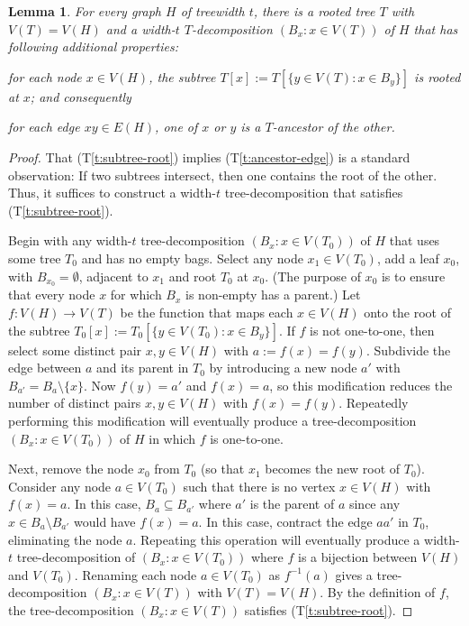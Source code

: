 \documentclass{patmorin}
\theoremstyle{plain}
\newtheorem{lem}[thm]{Lemma}
\theoremstyle{definition}
\newcommand{\tlabel}[1]{\label{t:#1}}
\newcommand{\tref}[1]{(T\ref{t:#1})}
\renewcommand{\le}{\leqslant}
\begin{document}
\begin{lem}\label{nice-decomposition}
  For every graph $H$ of treewidth $t$, there is a rooted tree $T$ with $V(T)=V(H)$ and a width-$t$ $T$-decomposition $(B_x:x\in V(T))$ of $H$ that has following additional properties:
  \begin{compactenum}[(T1)]
    \item\tlabel{subtree-root} for each node $x\in V(H)$, the subtree $T[x]:=T[\{y\in V(T):x\in B_y\}]$ is rooted at $x$; and consequently
    \item\tlabel{ancestor-edge}\tlabel{last} for each edge $xy\in E(H)$, one of $x$ or $y$ is a $T$-ancestor of the other.
  \end{compactenum}
\end{lem}

\begin{proof}
  That \tref{subtree-root} implies \tref{ancestor-edge} is a standard observation: If two subtrees intersect, then one contains the root of the other.  Thus, it suffices to construct a width-$t$ tree-decomposition that satisfies \tref{subtree-root}.

  Begin with any width-$t$ tree-decomposition $(B_x:x\in V(T_0))$ of $H$ that uses some tree $T_0$ and has no empty bags.  Select any node $x_1\in V(T_0)$, add a leaf $x_0$, with $B_{x_0}=\emptyset$, adjacent to $x_1$ and root $T_0$ at $x_0$. (The purpose of $x_0$ is to ensure that every node $x$ for which $B_x$ is non-empty has a parent.)  Let $f:V(H)\to V(T)$ be the function that maps each $x\in V(H)$ onto the root of the subtree $T_0[x]:=T_0[\{y\in V(T_0): x\in B_y\}]$.  If $f$ is not one-to-one, then select some distinct pair $x,y\in V(H)$ with $a:=f(x)=f(y)$.  Subdivide the edge between $a$ and its parent in $T_0$ by introducing a new node $a'$ with $B_{a'}=B_{a}\setminus\{x\}$. Now $f(y)=a'$ and $f(x)=a$, so this modification reduces the number of distinct pairs $x,y\in V(H)$ with $f(x)=f(y)$.  Repeatedly performing this modification will eventually produce a tree-decomposition $(B_x:x\in V(T_0))$ of $H$ in which $f$ is one-to-one.

  Next, remove the node $x_0$ from $T_0$ (so that $x_1$ becomes the new root of $T_0$).  Consider any node $a\in V(T_0)$ such that there is no vertex $x\in V(H)$ with $f(x)=a$.  In this case, $B_{a}\subseteq B_{a'}$ where $a'$ is the parent of $a$ since any $x\in B_a\setminus B_{a'}$ would have $f(x)=a$.  In this case, contract the edge $aa'$ in $T_0$, eliminating the node $a$.  Repeating this operation will eventually produce a width-$t$ tree-decomposition of $(B_x:x\in V(T_0))$ where $f$ is a bijection between $V(H)$ and $V(T_0)$.  Renaming each node $a\in V(T_0)$ as $f^{-1}(a)$ gives a tree-decomposition $(B_x:x\in V(T))$ with $V(T)=V(H)$.  By the definition of $f$, the tree-decomposition $(B_x:x\in V(T))$ satisfies \tref{subtree-root}.
\end{proof}
\end{document}
